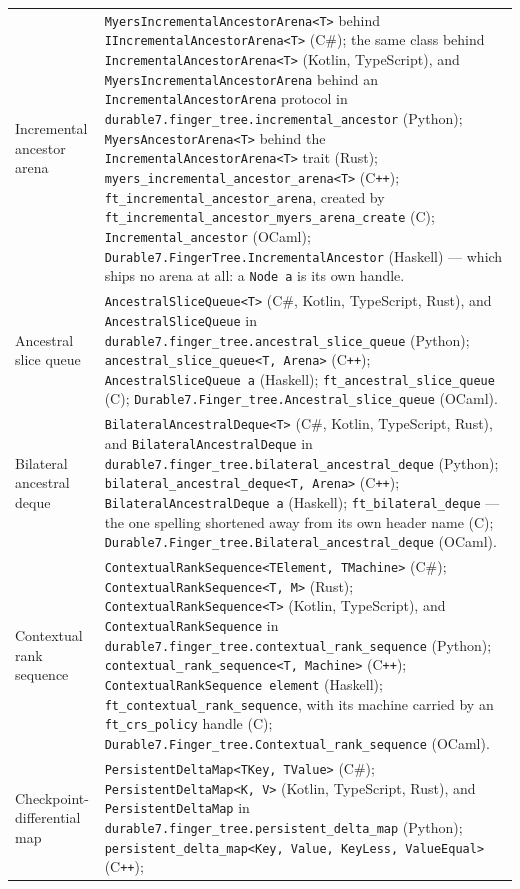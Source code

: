 \documentclass[11pt,twoside,openright]{book}
\makeatletter
\newcommand{\code}[1]{\texorpdfstring{\textcolor{d7ink}{\texttt{#1}}}{#1}}
\newenvironment{d7table}[1]
  {\par\vspace{3pt}\small
   \setlength{\LTpre}{4pt}\setlength{\LTpost}{4pt}
   \begin{longtable}{@{}%
     >{\raggedright\arraybackslash}p{#1\textwidth}%
     @{\hspace{10pt}}%
     >{\raggedright\arraybackslash}p{\dimexpr\textwidth-#1\textwidth-10pt\relax}@{}}}
  {\end{longtable}}
\makeatother
\begin{document}
\begin{d7table}{0.26}
Incremental ancestor arena &
\code{MyersIncrementalAncestorArena<T>} behind
\code{IIncrementalAncestorArena<T>} (C\#); the same class behind
\code{IncrementalAncestorArena<T>} (Kotlin, TypeScript), and
\code{MyersIncrementalAncestorArena} behind an
\code{IncrementalAncestorArena} protocol in
\code{durable7.finger\_tree.incremental\_ancestor} (Python);
\code{MyersAncestorArena<T>} behind the \code{IncrementalAncestorArena<T>} trait
(Rust); \code{myers\_incremental\_ancestor\_arena<T>} (C\texttt{++});
\code{ft\_incremental\_ancestor\_arena}, created by
\code{ft\_incremental\_ancestor\_myers\_arena\_create} (C);
\code{Incremental\_ancestor} (OCaml);
\code{Durable7.FingerTree.IncrementalAncestor} (Haskell) --- which ships no
arena at all: a \code{Node a} is its own handle. \\
Ancestral slice queue &
\code{AncestralSliceQueue<T>} (C\#, Kotlin, TypeScript, Rust), and
\code{AncestralSliceQueue} in
\code{durable7.finger\_tree.ancestral\_slice\_queue} (Python);
\code{ancestral\_slice\_queue<T, Arena>} (C\texttt{++});
\code{AncestralSliceQueue a} (Haskell);
\code{ft\_ancestral\_slice\_queue} (C);
\code{Durable7.Finger\_tree.Ancestral\_slice\_queue} (OCaml). \\
Bilateral ancestral deque &
\code{BilateralAncestralDeque<T>} (C\#, Kotlin, TypeScript, Rust), and
\code{BilateralAncestralDeque} in
\code{durable7.finger\_tree.bilateral\_ancestral\_deque} (Python);
\code{bilateral\_ancestral\_deque<T, Arena>} (C\texttt{++});
\code{BilateralAncestralDeque a} (Haskell);
\code{ft\_bilateral\_deque} --- the one spelling shortened away from its own
header name (C);
\code{Durable7.Finger\_tree.Bilateral\_ancestral\_deque} (OCaml). \\
Contextual rank sequence &
\code{ContextualRankSequence<TElement, TMachine>} (C\#);
\code{ContextualRankSequence<T, M>} (Rust);
\code{ContextualRankSequence<T>} (Kotlin, TypeScript), and
\code{ContextualRankSequence} in
\code{durable7.finger\_tree.contextual\_rank\_sequence} (Python);
\code{contextual\_rank\_sequence<T, Machine>} (C\texttt{++});
\code{ContextualRankSequence element} (Haskell);
\code{ft\_contextual\_rank\_sequence}, with its machine carried by an
\code{ft\_crs\_policy} handle (C);
\code{Durable7.Finger\_tree.Contextual\_rank\_sequence} (OCaml). \\
Checkpoint-differential map &
\code{PersistentDeltaMap<TKey, TValue>} (C\#);
\code{PersistentDeltaMap<K, V>} (Kotlin, TypeScript, Rust), and
\code{PersistentDeltaMap} in
\code{durable7.finger\_tree.persistent\_delta\_map} (Python);
\code{persistent\_delta\_map<Key, Value, KeyLess, ValueEqual>} (C\texttt{++});

\end{d7table}
\end{document}
